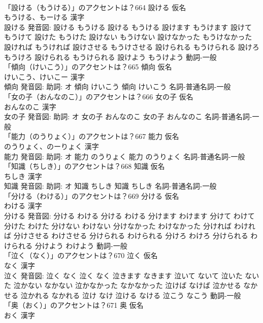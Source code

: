 \documentclass[8pt]{extreport}
\begin{document}
\begin{CJK}{UTF8}{min}
\\	「設ける（もうける）」のアクセントは？664	設ける 仮名　
\\	もうける、もーける 漢字　
\\	設ける 発音図:	設ける もうける		設ける もうける 設けます もうけます 設けて もうけて 設けた もうけた 設けない もうけない 設けなかった もうけなかった 設ければ もうければ 設けさせる もうけさせる 設けられる もうけられる 設けろ もうけろ 設けられる もうけられる 設けよう もうけよう				動詞-一般 
\\	「傾向（けいこう）」のアクセントは？665	傾向 仮名　
\\	けいこう、けいこー 漢字　
\\	傾向 発音図: 助詞: オ	傾向 けいこう		傾向 けいこう				名詞-普通名詞-一般 
\\	「女の子（おんなのこ）」のアクセントは？666	女の子 仮名　
\\	おんなのこ 漢字　
\\	女の子 発音図: 助詞: オ	女の子 おんなのこ		女の子 おんなのこ				名詞-普通名詞-一般 
\\	「能力（のうりょく）」のアクセントは？667	能力 仮名　
\\	のうりょく、のーりょく 漢字　
\\	能力 発音図: 助詞: オ	能力 のうりょく		能力 のうりょく				名詞-普通名詞-一般 
\\	「知識（ちしき）」のアクセントは？668	知識 仮名　
\\	ちしき 漢字　
\\	知識 発音図: 助詞: オ	知識 ちしき		知識 ちしき				名詞-普通名詞-一般 
\\	「分ける（わける）」のアクセントは？669	分ける 仮名　
\\	わける 漢字　
\\	分ける 発音図:	分ける わける		分ける わける 分けます わけます 分けて わけて 分けた わけた 分けない わけない 分けなかった わけなかった 分ければ わければ 分けさせる わけさせる 分けられる わけられる 分けろ わけろ 分けられる わけられる 分けよう わけよう				動詞-一般 
\\	「泣く（なく）」のアクセントは？670	泣く 仮名　
\\	なく 漢字　
\\	泣く 発音図:	泣く なく		泣く なく 泣きます なきます 泣いて ないて 泣いた ないた 泣かない なかない 泣かなかった なかなかった 泣けば なけば 泣かせる なかせる 泣かれる なかれる 泣け なけ 泣ける なける 泣こう なこう				動詞-一般 
\\	「奥（おく）」のアクセントは？671	奥 仮名　
\\	おく 漢字　

\end{CJK}
\end{document}
